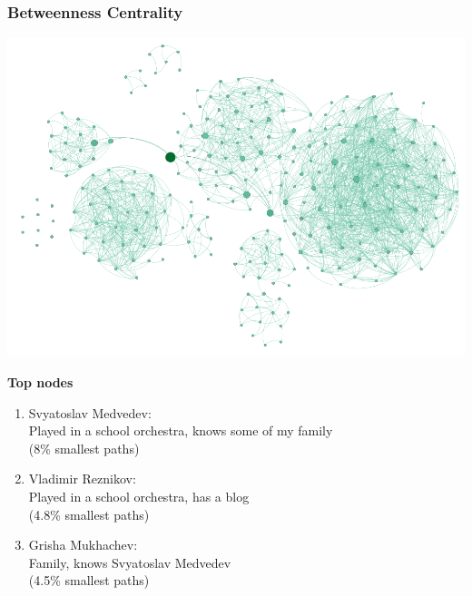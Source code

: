 \documentclass{beamer}
\begin{document}
\begin{frame}
\frametitle{Betweenness Centrality}
\begin{multicols}{2}
	\includegraphics[width=\columnwidth]{Betweeness_centr.png}
	\columnbreak
	
	\textbf{Top nodes}
	\begin{enumerate}
	\item Svyatoslav Medvedev:\\Played in a school orchestra, knows some of my family\\(8\% smallest paths)
	\item Vladimir Reznikov:\\Played in a school orchestra, has a blog\\(4.8\% smallest paths)
	\item Grisha Mukhachev:\\Family, knows Svyatoslav Medvedev\\(4.5\% smallest paths)
	\end{enumerate}
\end{multicols}

\end{frame}
\end{document}
